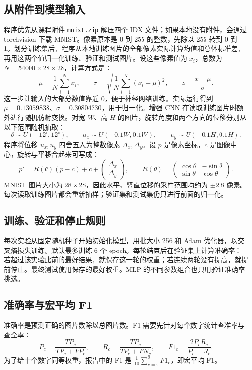 \documentclass[11pt,a4paper]{ctexart}
\begin{document}
\subsection{从附件到模型输入}
程序优先从课程附件 \texttt{mnist.zip} 解压四个 IDX 文件；如果本地没有附件，会通过 torchvision 下载 MNIST。像素原本是 0 到 255 的整数，先除以 255 转到 0 到 1。划分训练集后，程序从本地训练图片的全部像素实际计算均值和总体标准差，再用这两个值归一化训练、验证和测试图片。设这些像素值为 $x_i$，总数为 $N=54000\times28\times28$，计算方式是：
\begin{equation}
\mu=\frac{1}{N}\sum_{i=1}^{N}x_i,\qquad
\sigma=\sqrt{\frac{1}{N}\sum_{i=1}^{N}(x_i-\mu)^2},\qquad
z=\frac{x-\mu}{\sigma}.
\end{equation}
这一步让输入的大部分数值靠近 0，便于神经网络训练。实际运行得到 $\mu=0.13059838$、$\sigma=0.30804330$，用于归一化。增强 CNN 在读取训练图片时额外进行随机仿射变换。对宽 $W$、高 $H$ 的图片，旋转角度和两个方向的位移分别从以下范围随机抽取：
\begin{equation}
\theta\sim U(-12^\circ,12^\circ),\qquad
u_x\sim U(-0.1W,0.1W),\qquad
u_y\sim U(-0.1H,0.1H).
\end{equation}
程序将位移 $u_x,u_y$ 四舍五入为整数像素 $\Delta_x,\Delta_y$。设 $p$ 是像素坐标，$c$ 是图像中心，旋转与平移合起来可写成：
\begin{equation}
p'=R(\theta)(p-c)+c+
\begin{pmatrix}\Delta_x\\\Delta_y\end{pmatrix},\qquad
R(\theta)=
\begin{pmatrix}
\cos\theta&-\sin\theta\\
\sin\theta&\cos\theta
\end{pmatrix}.
\end{equation}
MNIST 图片大小为 $28\times28$，因此水平、竖直位移的采样范围均约为 $\pm2.8$ 像素。每次读取训练图片都会重新抽样；验证集和测试集仍只进行前面的归一化。

\subsection{训练、验证和停止规则}
每次实验从固定随机种子开始初始化模型，用批大小 256 和 Adam 优化器，以交叉熵损失训练。默认最多训练 6 个 epoch。每轮结束后在验证集上计算准确率：若超过该实验此前的最好结果，就保存这一轮的权重；若连续两轮没有提高，就提前停止。最终测试使用保存的最好权重。MLP 的不同参数组合也只用验证准确率挑选。

\subsection{准确率与宏平均 F1}
准确率是预测正确的图片数除以总图片数。F1 需要先针对每个数字统计查准率与查全率：
\begin{equation}
P_c=\frac{TP_c}{TP_c+FP_c},\qquad
R_c=\frac{TP_c}{TP_c+FN_c},\qquad
F1_c=\frac{2P_cR_c}{P_c+R_c}.
\end{equation}
为了给十个数字同等权重，报告中的 F1 是 $\frac{1}{10}\sum_{c=0}^{9}F1_c$，即宏平均 F1。
\end{document}
